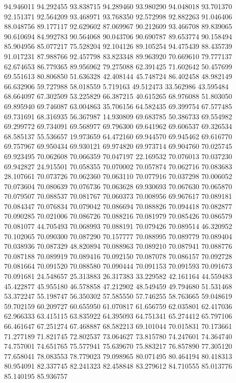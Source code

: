 94.946011
94.292455
93.838715
94.289460
93.980290
94.048018
93.701370
92.151371
92.564209
93.468971
93.768350
92.572998
92.882263
91.046406
88.048756
89.177117
92.629602
87.069967
90.212609
93.466708
89.839065
90.610694
84.992783
90.564068
90.043706
90.690787
89.653774
90.158494
85.904956
85.077217
75.528204
92.104126
89.105254
94.475439
88.435739
91.017231
87.988766
92.457798
83.823348
89.963920
70.669610
79.777137
62.674653
86.779365
89.956962
79.275088
62.391425
71.602642
50.457699
69.551613
80.806850
51.636328
42.408144
45.748724
86.402458
48.982149
66.632906
59.727988
58.018559
5.719163
49.512473
33.562986
43.595484
68.664097
67.302509
53.225829
66.387215
40.615265
68.976088
51.803050
69.895940
69.746087
63.004863
35.706156
64.582435
69.399754
67.577485
69.731691
68.316935
56.367987
14.930809
69.683785
50.386733
69.554982
69.299772
69.734091
69.568977
69.796300
69.641962
69.606537
69.326534
68.585137
55.536657
19.973659
64.472160
69.944570
69.945462
69.616770
69.757967
69.950434
69.930121
69.974820
69.973714
69.904760
70.025745
69.923495
70.062608
70.066359
70.047197
22.169532
70.076013
70.037230
69.942827
24.915501
70.058355
70.070002
70.057874
70.062716
70.083683
28.107661
70.073726
70.062360
70.063110
70.077916
70.037298
70.006052
70.073604
70.080639
70.076736
70.063628
69.930693
70.067630
70.065870
70.079507
70.088537
70.081767
70.060373
70.008956
69.967617
70.089181
70.084347
70.076834
70.079042
70.086694
70.088826
70.094418
70.082877
70.090285
70.021006
70.086726
70.088216
70.081979
70.085426
70.086579
70.081077
44.705493
70.068993
70.088191
70.079426
70.089514
46.320952
70.102065
70.090300
70.087290
70.157777
70.088995
70.089779
70.089404
70.038936
70.087329
48.820894
70.088963
70.089210
70.087941
70.088776
70.087188
70.089919
70.089416
70.092150
70.087078
70.086157
70.092728
70.081664
70.091520
70.088580
70.090444
70.091153
70.091593
70.091673
70.091681
24.548657
25.313883
26.317383
33.229582
42.161164
44.559483
45.422877
45.955180
46.578858
47.212902
48.549459
49.794680
51.531468
53.372247
55.198747
56.350302
57.585550
57.746255
58.763665
59.048619
59.702159
60.209727
60.655950
61.070817
61.656759
62.035801
62.417036
62.966333
63.415115
63.835922
64.395093
64.751341
65.274412
65.797106
66.461647
67.251274
67.468887
68.582213
69.101044
70.015831
70.173661
71.277189
71.821745
72.802537
73.064627
73.815780
74.247601
74.364740
74.757001
74.651765
75.577941
75.639670
75.883217
76.857890
77.305120
77.658041
78.083553
78.779023
79.098965
80.071495
80.464194
80.418313
80.954091
82.337745
82.241323
82.458848
83.279612
84.710555
85.013776
85.140195
85.936757
